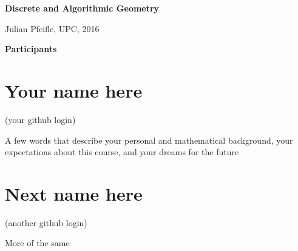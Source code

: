 \documentclass[11pt]{amsart}
\begin{document}
\begin{center}
\textbf{\sffamily
   Discrete and Algorithmic Geometry }

\medskip
   Julian Pfeifle,
   UPC, 2016 
\end{center}

\bigskip

\begin{center}
  \textbf{\sffamily Participants}
\end{center}

\medskip

\section*{Your name here}
(your github login) 

A few words that describe your personal and mathematical background, your expectations about this course, and your dreams for the future

\medskip

\section*{Next name here}
(another github login)

More of the same
\end{document}
